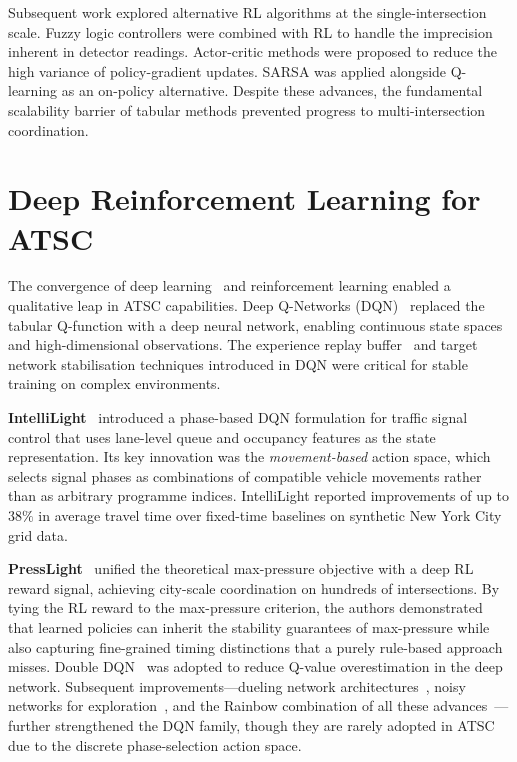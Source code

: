 \documentclass[12pt,oneside,a4paper]{report}
\begin{document}
Subsequent work explored alternative RL algorithms at the
single-intersection scale.  Fuzzy logic controllers were combined
with RL to handle the imprecision inherent in detector readings.
Actor-critic methods were proposed to reduce the high variance of
policy-gradient updates.  SARSA was applied alongside Q-learning
as an on-policy alternative.  Despite these advances, the
fundamental scalability barrier of tabular methods prevented
progress to multi-intersection coordination.

\section{Deep Reinforcement Learning for ATSC}
\label{sec:lit_deep}

The convergence of deep learning~\cite{deeplearning2015} and
reinforcement learning enabled a qualitative leap in ATSC
capabilities.  Deep Q-Networks (DQN)~\cite{dqn2015} replaced the
tabular Q-function with a deep neural network, enabling continuous
state spaces and high-dimensional observations.  The experience
replay buffer~\cite{per2016} and target network stabilisation techniques
introduced in DQN were critical for stable training on complex
environments.

\textbf{IntelliLight}~\cite{intellilight2018} introduced a
phase-based DQN formulation for traffic signal control that uses
lane-level queue and occupancy features as the state representation.
Its key innovation was the \emph{movement-based} action space,
which selects signal phases as combinations of compatible vehicle
movements rather than as arbitrary programme indices.  IntelliLight
reported improvements of up to $38\%$ in average travel time over
fixed-time baselines on synthetic New York City grid data.

\textbf{PressLight}~\cite{presslight2019} unified the theoretical
max-pressure objective with a deep RL reward signal, achieving
city-scale coordination on hundreds of intersections.  By tying the
RL reward to the max-pressure criterion, the authors demonstrated
that learned policies can inherit the stability guarantees of
max-pressure while also capturing fine-grained timing distinctions
that a purely rule-based approach misses.  Double DQN~\cite{doubledqn2016}
was adopted to reduce Q-value overestimation in the deep network.
Subsequent improvements---dueling network architectures~\cite{dueling2016},
noisy networks for exploration~\cite{noisynets2018}, and the Rainbow
combination of all these advances~\cite{rainbow2018}---further strengthened
the DQN family, though they are rarely adopted in ATSC due to the discrete
phase-selection action space.
\end{document}
